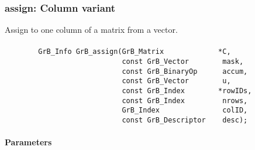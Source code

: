 \subsubsection{{\sf assign}: Column variant}

Assign to one column of a matrix from a vector.  



\paragraph{\syntax}

\begin{verbatim}
        GrB_Info GrB_assign(GrB_Matrix             *C,
                            const GrB_Vector        mask,
                            const GrB_BinaryOp      accum,
                            const GrB_Vector        u,
                            const GrB_Index        *rowIDs,
                            const GrB_Index         nrows,
                            GrB_Index               colID,
                            const GrB_Descriptor    desc); 
\end{verbatim}

\paragraph{Parameters}

